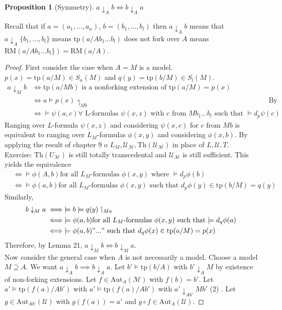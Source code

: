 \documentclass[letterpaper, 12pt]{article}
\newcommand{\cU}{\mathcal{U}}
\newcommand{\cM}{\mathcal{M}}
\newcommand{\Th}{\mbox{Th}}
\newcommand{\Aut}{\mbox{Aut}}
\newcommand{\tp}{\mbox{tp}}
\newcommand{\RM}{\mbox{RM}}
\newcommand{\da}{\downarrow}
\newcommand{\uhl}{\upharpoonleft}
\theoremstyle{stdthm}
\newtheorem{prop}[thm]{Proposition}
\theoremstyle{stddef}
\theoremstyle{stdnonum}
\theoremstyle{stdqands}
\theoremstyle{stdbold}
\begin{document}
\begin{prop}[Symmetry]
$a \da_A b \iff b \da_A a$ 
\end{prop}

Recall that if $a = (a_1,\dots, a_n)$, $b = (b_1,\dots,b_l)$ then $a \da_A b$ means that $a \da_A \{b_1,\dots,b_l\}$ means $\tp(a/Ab_1\dots b_l)$ does not fork over $A$ means $\RM(a/Ab_1\dots b_l\}) = \RM(a/A)$. 

\begin{proof}
First consider the case when $A = M$ is a model. $p(x) = \tp(a/M) \in S_n(M)$ and $q(y) = \tp(b/M) \in S_l(M)$. 
\begin{align*}
a \da_M b &\iff \tp(a/Mb) \mbox{ is a nonforking extension of }\tp(a/M) = p(x)  \\
& \iff  a \models p(x) \uhl_{Mb} &\text{By Stationarity}\\
& \iff \models \psi(a,c) \forall \mbox{ L-formulas $\psi(x,z)$ with $c$ from $Mb_1\dots b_l$ such that $\models d_p \psi(c)$ }
\end{align*}
Ranging over $L$-formula $\psi(x,z)$ and considering $\psi(x,c)$ for $c$ from $Mb$ is equivalent to ranging over $L_M$-formulas $\phi(x,y)$ and considering $\phi(x,b)$. By applying the result of chapter 9 o $L_M, \cU_\cM, \Th(\cU_\cM)$ in place of $L, \cU, T$. Exercise: $\Th(U_\cM)$ is still totally transcedental and $\cU_\cM$ is still sufficient. This yields the equivalence 
\begin{align*}
&\iff \models \phi(A,b) \mbox{for all $L_M$-formulas $\phi(x,y)$ where $\models d_p \phi(b)$} \\
& \iff \models \phi(a,b) \mbox{for all $L_M$-formulas $\phi(x,y)$ such that $d_p \phi(y) \in \tp(b/M) = q(y)$} 
\end{align*}
Similarly, 
\begin{align*}
 b \da_M a &\iff \models b \models q(y) \uhl_{Ma} \\
 & \iff \models \phi(a,b) \mbox{for all $L_M$-formulas $\phi(x,y)$ such that $\models d_q \phi(a)$} \\
 & \iff \models \phi(a,b) " ... " \mbox{ such that $d_q \phi(x) \in \tp(a/M) = p(x)$} 
\end{align*}
Therefore, by Lemma 21, $a \da_M  b \iff b \da_M a$. \\

Now consider the general case when $A$ is not necessarily a model. Choose a model $M\supseteq A$. We want $a \da_A b \implies b \da_A a$. Let $b' \models \tp(b/A)$ with $b' \da_A M$ by existence of non-forking extensions. Let $f \in \Aut_A(\cM)$ with $f(b) = b'$. Let $a' \models \tp(f(a)/Ab')$ with $a' \models \tp(f(a)/Ab')$ with $a' \da_{Ab'} Mb'$ (2) . Let $g \in \Aut_{Ab'}(\cU)$ with $g(f(a)) = a'$ and $g\circ f \in \Aut_A(\cU)$. 


\end{proof}
\end{document}
